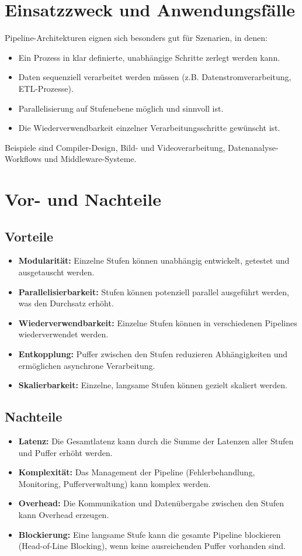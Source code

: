 \documentclass[a4paper]{article} %
\begin{document}
\section{Einsatzzweck und Anwendungsfälle}
Pipeline-Architekturen eignen sich besonders gut für Szenarien, in denen:
\begin{itemize}
    \item Ein Prozess in klar definierte, unabhängige Schritte zerlegt werden kann.
    \item Daten sequenziell verarbeitet werden müssen (z.B. Datenstromverarbeitung, ETL-Prozesse).
    \item Parallelisierung auf Stufenebene möglich und sinnvoll ist.
    \item Die Wiederverwendbarkeit einzelner Verarbeitungsschritte gewünscht ist.
\end{itemize}
Beispiele sind Compiler-Design, Bild- und Videoverarbeitung, Datenanalyse-Workflows und Middleware-Systeme.
\lipsum[4-5]

\section{Vor- und Nachteile}
\subsection{Vorteile}
\begin{itemize}
    \item \textbf{Modularität:} Einzelne Stufen können unabhängig entwickelt, getestet und ausgetauscht werden.
    \item \textbf{Parallelisierbarkeit:} Stufen können potenziell parallel ausgeführt werden, was den Durchsatz erhöht.
    \item \textbf{Wiederverwendbarkeit:} Einzelne Stufen können in verschiedenen Pipelines wiederverwendet werden.
    \item \textbf{Entkopplung:} Puffer zwischen den Stufen reduzieren Abhängigkeiten und ermöglichen asynchrone Verarbeitung.
    \item \textbf{Skalierbarkeit:} Einzelne, langsame Stufen können gezielt skaliert werden.
\end{itemize}
\blindtext[2]

\subsection{Nachteile}
\begin{itemize}
    \item \textbf{Latenz:} Die Gesamtlatenz kann durch die Summe der Latenzen aller Stufen und Puffer erhöht werden.
    \item \textbf{Komplexität:} Das Management der Pipeline (Fehlerbehandlung, Monitoring, Pufferverwaltung) kann komplex werden.
    \item \textbf{Overhead:} Die Kommunikation und Datenübergabe zwischen den Stufen kann Overhead erzeugen.
    \item \textbf{Blockierung:} Eine langsame Stufe kann die gesamte Pipeline blockieren (Head-of-Line Blocking), wenn keine ausreichenden Puffer vorhanden sind.
\end{itemize}
\lipsum[6-7]
\end{document}
